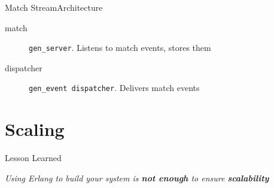 \documentclass[utf8]{beamer}
\begin{document}
\begin{frame}[t]{Match Stream}{Architecture}
{\begin{description}
			\item[match]
				\texttt{gen\_server}. Listens to match events, stores them
			\item[dispatcher]
				\texttt{gen\_event dispatcher}. Delivers match events
		\end{description}}
\end{frame}

\section{Scaling}
\begin{frame}{Lesson Learned}
	\begin{center}
		\huge \emph{Using Erlang to build your system is \textbf{not enough} to ensure \textbf{scalability}}
	\end{center}
\end{frame}
\end{document}
